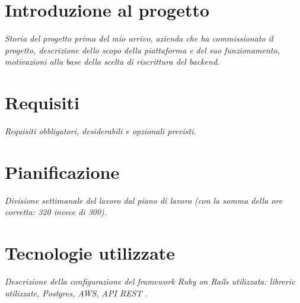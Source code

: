 \section{Introduzione al progetto}
\emph{Storia del progetto prima del mio arrivo, azienda che ha commissionato il progetto, descrizione dello scopo della piattaforma e del suo funzionamento, motivazioni alla base della scelta di riscrittura del backend.}

\section{Requisiti}
\emph{Requisiti obbligatori, desiderabili e opzionali previsti.}

\section{Pianificazione}
\emph{Divisione settimanale del lavoro dal piano di lavoro (con la somma della ore corretta: 320 invece di 300).}

\section{Tecnologie utilizzate}
\emph{Descrizione della configurazione del framework Ruby on Rails utilizzata: librerie utilizzate, Postgres, AWS, API REST .}
